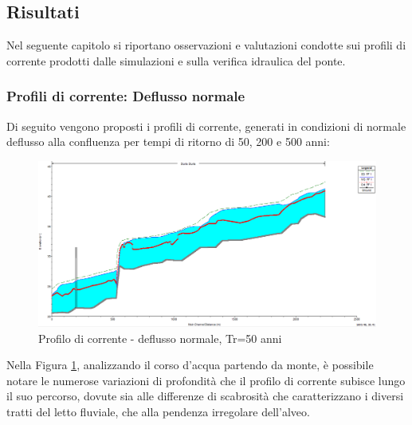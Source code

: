 \documentclass[12pt]{article} %
\begin{document}
\newpage
\subsection{Risultati}

\noindent Nel seguente capitolo si riportano osservazioni e valutazioni condotte sui profili di corrente prodotti dalle simulazioni e sulla verifica idraulica del ponte.

\subsubsection{Profili di corrente: Deflusso normale}

\noindent Di seguito vengono proposti i profili di corrente, generati in condizioni di normale deflusso alla confluenza per tempi di ritorno di 50, 200 e 500 anni:
\begin{figure}[H]
    \centering
    \includegraphics[scale=0.5]{ProfU474.PNG}
    \caption{Profilo di corrente - deflusso normale, Tr=50 anni}
    \label{fig:normale_50}
\end{figure}

\noindent Nella Figura \ref{fig:normale_50}, analizzando il corso d'acqua partendo da monte, è possibile notare le numerose variazioni di profondità che il profilo di corrente subisce lungo il suo percorso, dovute sia alle differenze di scabrosità che caratterizzano i diversi tratti del letto fluviale, che alla pendenza irregolare dell'alveo.
\end{document}
